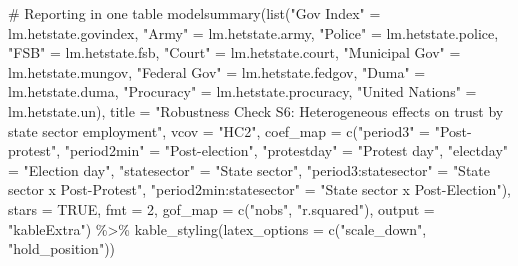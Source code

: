 \documentclass[
  letterpaper,
  DIV=11,
  numbers=noendperiod]{scrartcl}
\newenvironment{Shaded}{\begin{snugshade}}{\end{snugshade}}
\newcommand{\AttributeTok}[1]{\textcolor[rgb]{0.40,0.45,0.13}{#1}}
\newcommand{\CommentTok}[1]{\textcolor[rgb]{0.37,0.37,0.37}{#1}}
\newcommand{\ConstantTok}[1]{\textcolor[rgb]{0.56,0.35,0.01}{#1}}
\newcommand{\DecValTok}[1]{\textcolor[rgb]{0.68,0.00,0.00}{#1}}
\newcommand{\FunctionTok}[1]{\textcolor[rgb]{0.28,0.35,0.67}{#1}}
\newcommand{\NormalTok}[1]{\textcolor[rgb]{0.00,0.23,0.31}{#1}}
\newcommand{\OtherTok}[1]{\textcolor[rgb]{0.00,0.23,0.31}{#1}}
\newcommand{\SpecialCharTok}[1]{\textcolor[rgb]{0.37,0.37,0.37}{#1}}
\newcommand{\StringTok}[1]{\textcolor[rgb]{0.13,0.47,0.30}{#1}}
\begin{document}
\begin{Shaded}
\begin{Highlighting}[]
\CommentTok{\# Reporting in one table}
\FunctionTok{modelsummary}\NormalTok{(}\FunctionTok{list}\NormalTok{(}\StringTok{"Gov Index"} \OtherTok{=}\NormalTok{ lm.hetstate.govindex, }\StringTok{"Army"} \OtherTok{=}\NormalTok{ lm.hetstate.army, }
                  \StringTok{"Police"} \OtherTok{=}\NormalTok{ lm.hetstate.police, }\StringTok{"FSB"} \OtherTok{=}\NormalTok{ lm.hetstate.fsb, }
                  \StringTok{"Court"} \OtherTok{=}\NormalTok{ lm.hetstate.court, }\StringTok{"Municipal Gov"} \OtherTok{=}\NormalTok{ lm.hetstate.mungov,}
                  \StringTok{"Federal Gov"} \OtherTok{=}\NormalTok{ lm.hetstate.fedgov, }\StringTok{"Duma"} \OtherTok{=}\NormalTok{ lm.hetstate.duma, }
                  \StringTok{"Procuracy"} \OtherTok{=}\NormalTok{ lm.hetstate.procuracy, }\StringTok{"United Nations"} \OtherTok{=}\NormalTok{ lm.hetstate.un),}
             \AttributeTok{title =} \StringTok{"Robustness Check S6: Heterogeneous effects on trust by state sector employment"}\NormalTok{,}
             \AttributeTok{vcov =} \StringTok{"HC2"}\NormalTok{,}
             \AttributeTok{coef\_map =} \FunctionTok{c}\NormalTok{(}\StringTok{"period3"} \OtherTok{=} \StringTok{"Post{-}protest"}\NormalTok{,}
                          \StringTok{"period2min"} \OtherTok{=} \StringTok{"Post{-}election"}\NormalTok{,}
                          \StringTok{"protestday"} \OtherTok{=} \StringTok{"Protest day"}\NormalTok{,}
                          \StringTok{"electday"} \OtherTok{=} \StringTok{"Election day"}\NormalTok{,}
                          \StringTok{"statesector"} \OtherTok{=} \StringTok{"State sector"}\NormalTok{,}
                          \StringTok{"period3:statesector"} \OtherTok{=} \StringTok{"State sector x Post{-}Protest"}\NormalTok{,}
                          \StringTok{"period2min:statesector"} \OtherTok{=} \StringTok{"State sector x Post{-}Election"}\NormalTok{),}
             \AttributeTok{stars =} \ConstantTok{TRUE}\NormalTok{, }\AttributeTok{fmt =} \DecValTok{2}\NormalTok{, }\AttributeTok{gof\_map =} \FunctionTok{c}\NormalTok{(}\StringTok{"nobs"}\NormalTok{, }\StringTok{"r.squared"}\NormalTok{),}
             \AttributeTok{output =} \StringTok{"kableExtra"}\NormalTok{) }\SpecialCharTok{\%\textgreater{}\%} 
   \FunctionTok{kable\_styling}\NormalTok{(}\AttributeTok{latex\_options =} \FunctionTok{c}\NormalTok{(}\StringTok{"scale\_down"}\NormalTok{, }\StringTok{"hold\_position"}\NormalTok{))}
\end{Highlighting}
\end{Shaded}
\end{document}
